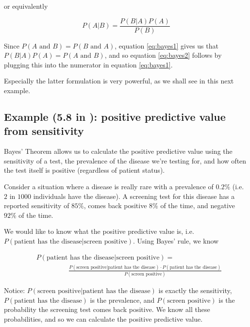 \documentclass[]{book}
\theoremstyle{definition}
\theoremstyle{definition}
\theoremstyle{definition}
\theoremstyle{remark}
\begin{document}
or equivalently

\[
P(A | B) = \frac{P(B | A)P(A)}{P(B)} \label{eq:bayes2}
\]

Since \(P(A \text{ and } B) = P(B \text{ and } A)\), equation \eqref{eq:bayes1} gives us that \(P(B | A)P(A) = P(A \text{ and } B)\), and so equation \eqref{eq:bayes2} follows by plugging this into the numerator in equation \eqref{eq:bayes1}.

Especially the latter formulation is very powerful, as we shall see in this next example.

\hypertarget{example-5.8-in-ls-positive-predictive-value-from-sensitivity}{%
\subsection{\texorpdfstring{Example (5.8 in \citet{ls}): positive predictive value from sensitivity}{Example (5.8 in @ls): positive predictive value from sensitivity}}\label{example-5.8-in-ls-positive-predictive-value-from-sensitivity}}

Bayes' Theorem allows us to calculate the positive predictive value using the sensitivity of a test, the prevalence of the disease we're testing for, and how often the test itself is positive (regardless of patient status).

Consider a situation where a disease is really rare with a prevalence of \(0.2\%\) (i.e.~\(2\) in \(1000\) individuals have the disease). A screening test for this disease has a reported sensitivity of \(85\%\), comes back positive \(8\%\) of the time, and negative \(92\%\) of the time.

We would like to know what the positive predictive value is, i.e.~\(P(\text{patient has the disease} | \text{screen positive})\). Using Bayes' rule, we know

\begin{align*}
  &P(\text{patient has the disease} | \text{screen positive}) = \\
  &\hspace{2cm} \frac{P(\text{screen positive} | \text{patient has the disease}) \cdot P(\text{patient has the disease})}{P(\text{screen positive})}
\end{align*}

Notice: \(P(\text{screen positive} | \text{patient has the disease})\) is exactly the sensitivity, \(P(\text{patient has the disease})\) is the prevalence, and \(P(\text{screen positive})\) is the probability the screening test comes back positive. We know all these probabilities, and so we can calculate the positive predictive value.
\end{document}
